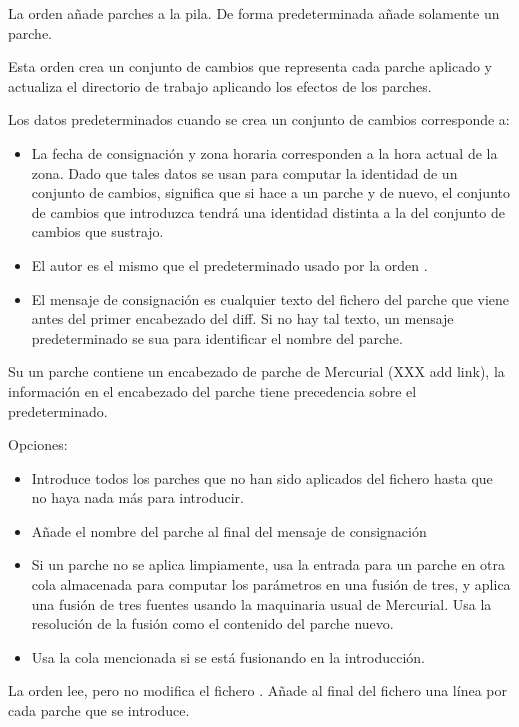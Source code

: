La orden  añade parches a la pila.  De forma
predeterminada añade solamente un parche.

Esta orden crea un conjunto de cambios que representa cada parche
aplicado y actualiza el directorio de trabajo aplicando los efectos de
los parches.

Los datos predeterminados cuando se crea un conjunto de cambios
corresponde a:
\begin{itemize}
\item La fecha de consignación y zona horaria corresponden a la hora
  actual de la zona.  Dado que tales datos se usan para computar la
  identidad de un conjunto de cambios, significa que si hace
   a un parche y  de nuevo, el
  conjunto de cambios que introduzca tendrá una identidad distinta a
  la del conjunto de cambios que sustrajo.
\item El autor es el mismo que el predeterminado usado por la orden
  .
\item El mensaje de consignación es cualquier texto del fichero del
  parche que viene antes del primer encabezado del diff.  Si no hay
  tal texto, un mensaje predeterminado se sua para identificar el
  nombre del parche.
\end{itemize}
Su un parche contiene un encabezado de parche de Mercurial (XXX add
link), la información en el encabezado del parche tiene precedencia
sobre el predeterminado.

Opciones:
\begin{itemize}
\item[\hgxopt{mq}{qpush}{-a}] Introduce todos los parches que no han
  sido aplicados del fichero  hasta que no haya nada
  más para introducir.
\item[\hgxopt{mq}{qpush}{-l}] Añade el nombre del parche al final del
  mensaje de consignación
\item[\hgxopt{mq}{qpush}{-m}] Si un parche no se aplica limpiamente,
  usa la entrada para un parche en otra cola almacenada para computar
  los parámetros en una fusión de tres, y aplica una fusión de tres
  fuentes usando la maquinaria usual de Mercurial.  Usa la resolución
  de la fusión como el contenido del parche nuevo.
\item[\hgxopt{mq}{qpush}{-n}] Usa la cola mencionada si se está
  fusionando en la introducción.
\end{itemize}

La orden  lee, pero no modifica el fichero
.  Añade al final del fichero  una
línea por cada parche que se introduce.

